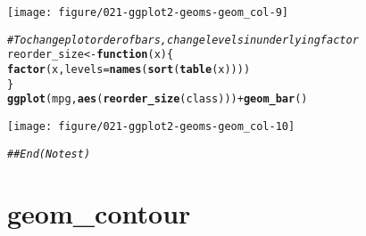 \documentclass[a4paper,titlepage]{tufte-handout}\usepackage[]{graphicx}\usepackage[]{color}
\makeatletter
\def\maxwidth{ %
  \ifdim\Gin@nat@width>\linewidth
    \linewidth
  \else
    \Gin@nat@width
  \fi
}
\newcommand{\hlcom}[1]{\textcolor[rgb]{0.678,0.584,0.686}{\textit{#1}}}%
\newcommand{\hlopt}[1]{\textcolor[rgb]{0,0,0}{#1}}%
\newcommand{\hlstd}[1]{\textcolor[rgb]{0.345,0.345,0.345}{#1}}%
\newcommand{\hlkwa}[1]{\textcolor[rgb]{0.161,0.373,0.58}{\textbf{#1}}}%
\newcommand{\hlkwb}[1]{\textcolor[rgb]{0.69,0.353,0.396}{#1}}%
\newcommand{\hlkwc}[1]{\textcolor[rgb]{0.333,0.667,0.333}{#1}}%
\newcommand{\hlkwd}[1]{\textcolor[rgb]{0.737,0.353,0.396}{\textbf{#1}}}%
\newenvironment{kframe}{%
 \def\at@end@of@kframe{}%
 \ifinner\ifhmode%
  \def\at@end@of@kframe{\end{minipage}}%
  \begin{minipage}{\columnwidth}%
 \fi\fi%
 \def\FrameCommand##1{\hskip\@totalleftmargin \hskip-\fboxsep
 \colorbox{shadecolor}{##1}\hskip-\fboxsep
     \hskip-\linewidth \hskip-\@totalleftmargin \hskip\columnwidth}%
 \MakeFramed {\advance\hsize-\width
   \@totalleftmargin\z@ \linewidth\hsize
   \@setminipage}}%
 {\par\unskip\endMakeFramed%
 \at@end@of@kframe}
\newenvironment{knitrout}{}{} %
\makeatother
\begin{document}
\begin{knitrout}
\begin{kframe}
\begin{alltt}
\end{alltt}
\end{kframe}
\texttt{[image: figure/021-ggplot2-geoms-geom\_col-9]} 
\begin{kframe}\begin{alltt}
\hlcom{# To change plot order of bars, change levels in underlying factor}
\hlstd{reorder_size} \hlkwb{<-} \hlkwa{function}\hlstd{(}\hlkwc{x}\hlstd{) \{}
  \hlkwd{factor}\hlstd{(x,} \hlkwc{levels} \hlstd{=} \hlkwd{names}\hlstd{(}\hlkwd{sort}\hlstd{(}\hlkwd{table}\hlstd{(x))))}
\hlstd{\}}
\hlkwd{ggplot}\hlstd{(mpg,} \hlkwd{aes}\hlstd{(}\hlkwd{reorder_size}\hlstd{(class)))} \hlopt{+} \hlkwd{geom_bar}\hlstd{()}
\end{alltt}
\end{kframe}
\texttt{[image: figure/021-ggplot2-geoms-geom\_col-10]} 
\begin{kframe}\begin{alltt}
\hlcom{## End(No test)}
\end{alltt}
\end{kframe}
\end{knitrout}


\section{geom\_contour}
\end{document}
